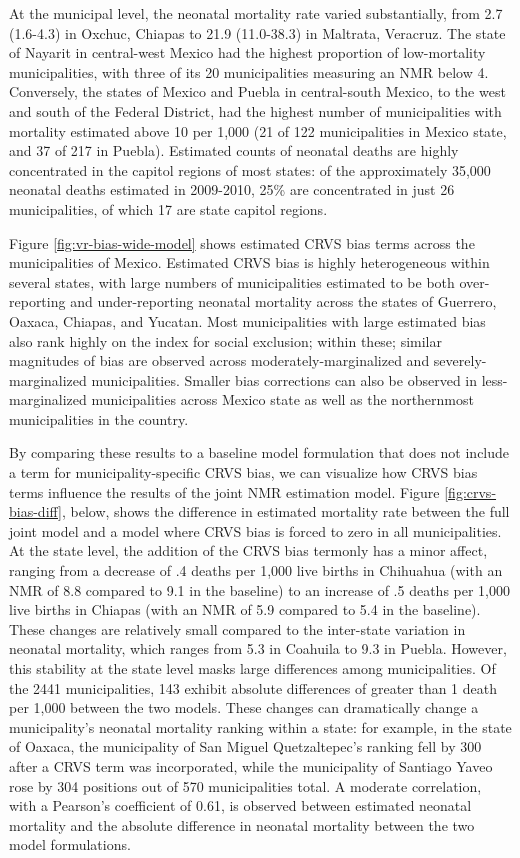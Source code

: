 \documentclass[
]{article}
\begin{document}
At the municipal level, the neonatal mortality rate varied substantially, from 2.7 (1.6-4.3) in Oxchuc, Chiapas to 21.9 (11.0-38.3) in Maltrata, Veracruz. The state of Nayarit in central-west Mexico had the highest proportion of low-mortality municipalities, with three of its 20 municipalities measuring an NMR below 4. Conversely, the states of Mexico and Puebla in central-south Mexico, to the west and south of the Federal District, had the highest number of municipalities with mortality estimated above 10 per 1,000 (21 of 122 municipalities in Mexico state, and 37 of 217 in Puebla). Estimated counts of neonatal deaths are highly concentrated in the capitol regions of most states: of the approximately 35,000 neonatal deaths estimated in 2009-2010, 25\% are concentrated in just 26 municipalities, of which 17 are state capitol regions.

Figure \ref{fig:vr-bias-wide-model} shows estimated CRVS bias terms across the municipalities of Mexico. Estimated CRVS bias is highly heterogeneous within several states, with large numbers of municipalities estimated to be both over-reporting and under-reporting neonatal mortality across the states of Guerrero, Oaxaca, Chiapas, and Yucatan. Most municipalities with large estimated bias also rank highly on the index for social exclusion; within these; similar magnitudes of bias are observed across moderately-marginalized and severely-marginalized municipalities. Smaller bias corrections can also be observed in less-marginalized municipalities across Mexico state as well as the northernmost municipalities in the country.

By comparing these results to a baseline model formulation that does not include a term for municipality-specific CRVS bias, we can visualize how CRVS bias terms influence the results of the joint NMR estimation model. Figure \ref{fig:crvs-bias-diff}, below, shows the difference in estimated mortality rate between the full joint model and a model where CRVS bias is forced to zero in all municipalities. At the state level, the addition of the CRVS bias termonly has a minor affect, ranging from a decrease of .4 deaths per 1,000 live births in Chihuahua (with an NMR of 8.8 compared to 9.1 in the baseline) to an increase of .5 deaths per 1,000 live births in Chiapas (with an NMR of 5.9 compared to 5.4 in the baseline). These changes are relatively small compared to the inter-state variation in neonatal mortality, which ranges from 5.3 in Coahuila to 9.3 in Puebla. However, this stability at the state level masks large differences among municipalities. Of the 2441 municipalities, 143 exhibit absolute differences of greater than 1 death per 1,000 between the two models. These changes can dramatically change a municipality's neonatal mortality ranking within a state: for example, in the state of Oaxaca, the municipality of San Miguel Quetzaltepec's ranking fell by 300 after a CRVS term was incorporated, while the municipality of Santiago Yaveo rose by 304 positions out of 570 municipalities total. A moderate correlation, with a Pearson's coefficient of 0.61, is observed between estimated neonatal mortality and the absolute difference in neonatal mortality between the two model formulations.
\end{document}
